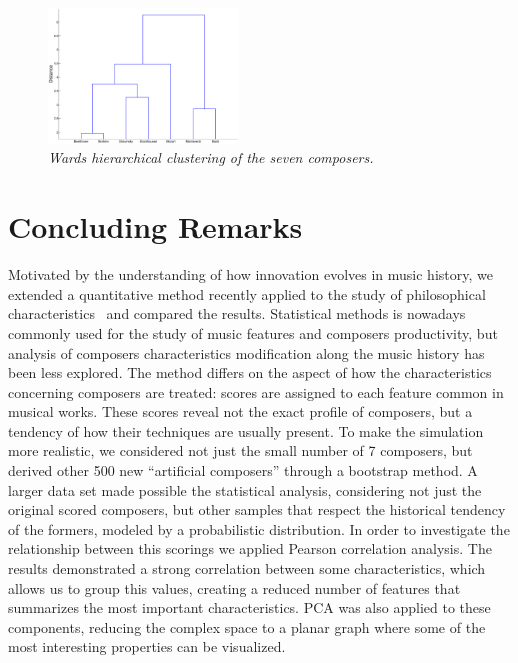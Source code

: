 \documentclass[
 aip,
 jmp,
 amsmath,amssymb,
 reprint,
]{revtex4-1}
\begin{document}
\begin{figure}[ht]
        \begin{center}
          \includegraphics[width=0.45\textwidth]{Clust_Compositores.eps}
        \end{center}
        \caption{\it Wards hierarchical clustering of the seven composers.}
        \label{fig:dendrogram}
\end{figure}


\section{Concluding Remarks}

Motivated by the understanding of how innovation evolves in music
history, we extended a quantitative method
recently applied to the study of philosophical
characteristics~\cite{Fabbri} and compared the results. Statistical
methods is nowadays commonly used for the study of music features and
composers productivity, but analysis of
composers characteristics modification along the music history has been less
explored. The method differs on the
aspect of how the characteristics concerning composers are treated:
scores are assigned to each feature common in musical
works. These scores reveal not the
exact profile of composers, but a tendency of how their
techniques are usually present. To make the simulation more
realistic, we considered not just the small number of 7 composers, but
derived other 500 new ``artificial composers'' through a bootstrap
method. A larger data set made possible the statistical analysis,
considering not just the original scored composers, but other samples
that respect the historical tendency of the formers, modeled by a
probabilistic distribution.
In order to investigate the
relationship between this scorings we applied Pearson correlation
analysis. The results demonstrated a strong correlation between some
characteristics, which allows us to group this values, creating a
reduced number of features that summarizes the most important
characteristics. PCA was also applied to these components, reducing
the complex space to a planar graph where some of the most interesting
properties can be visualized. 
\end{document}
